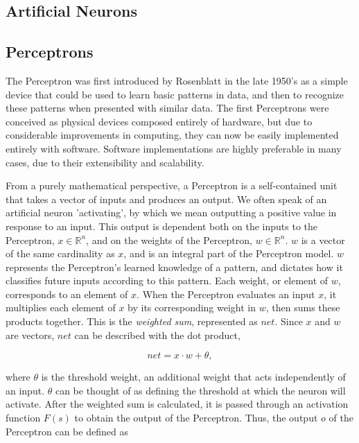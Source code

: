 \documentclass[a4paper, 11pt]{article} %
\begin{document}
\subsection*{Artificial Neurons}



\subsection*{Perceptrons}

The Perceptron was first introduced by Rosenblatt in the late 1950's \cite{rosenblatt} as a simple device that could be used to learn basic patterns in data, and then to recognize these patterns when presented with similar data.  The first Perceptrons were conceived as physical devices composed entirely of hardware, but due to considerable improvements in computing, they can now be easily implemented entirely with software.  Software implementations are highly preferable in many cases, due to their extensibility and scalability.

From a purely mathematical perspective, a Perceptron is a self-contained unit that takes a vector of inputs and produces an output.  We often speak of an artificial neuron 'activating', by which we mean outputting a positive value in response to an input.  This output is dependent both on the inputs to the Perceptron, $x\in\mathbb{R}^n$, and on the weights of the Perceptron, $w\in\mathbb{R}^n$.  $w$ is a vector of the same cardinality as $x$, and is an integral part of the Perceptron model.  $w$ represents the Perceptron's learned knowledge of a pattern, and dictates how it classifies future inputs according to this pattern.  Each weight, or element of $w$, corresponds to an element of $x$.  When the Perceptron evaluates an input $x$, it multiplies each element of $x$ by its corresponding weight in $w$, then sums these products together.  This is the \textit{weighted sum}, represented as $net$.  Since $x$ and $w$ are vectors, $net$ can be described with the dot product,

\begin{equation}
net = x \cdot w + \theta ,
\end{equation}

where $\theta$ is the threshold weight, an additional weight that acts independently of an input.  $\theta$ can be thought of as defining the threshold at which the neuron will activate.  After the weighted sum is calculated, it is passed through an activation function $F(s)$ to obtain the output of the Perceptron.  Thus, the output $o$ of the Perceptron can be defined as
\end{document}
